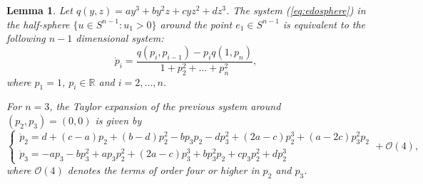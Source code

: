 \documentclass[10pt,a4paper]{amsart}
\newtheorem{lem}{Lemma}
\begin{document}
\begin{lem}\label{lem:2dsystem}
 Let $q(y,z)=a y^3+b y^2 z+c y z^2+d z^3$.	
	The system (\ref{eq:edosphere}) in the half-sphere $\{u\in S^{n-1}:u_1>0 \}$ around the point $e_1\in S^{n-1}$ is equivalent to the following $n-1$ dimensional system:
$$\dot{p}_i=\dfrac{q(p_i,p_{i-1})-p_i q(1,p_n)}{1+p_2^2+\dots +p_n^2},$$
where $p_1=1$, $p_i\in\mathbb{R}$ and $i=2,\dots,n$.

For $n=3$, the Taylor expansion of the previous system around $(p_2,p_3)=(0,0)$ is given by 
$$\begin{cases}
\dot{p}_2 =d+(c-a)p_2+(b-d)p_2^2  -b p_3 p_2-d p_3^2+(2a-c) p_2^3 +(a-2c)p_3^2 p_2 \\
\dot{p}_3 = -a p_3- bp_3^2+a p_3 p_2^2+(2a-c)p_3^3+bp_3^2p_2+cp_3p_2^2+dp_2^3 
\end{cases}+\mathcal{O}(4),$$
where $\mathcal{O}(4)$ denotes the terms of order four or higher in $p_2$ and $p_3$.
\end{lem}
\end{document}
